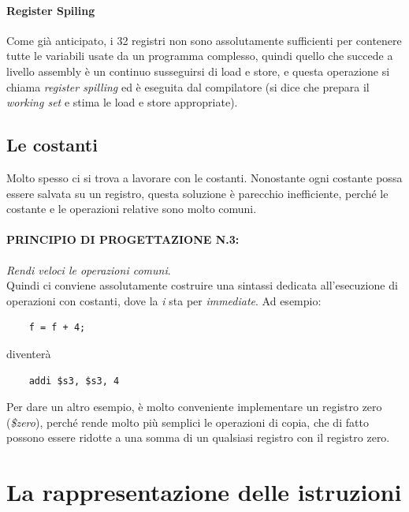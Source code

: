 \documentclass[class=book, crop=false]{standalone}
\begin{document}
\paragraph{Register Spiling}
Come già anticipato, i 32 registri non sono assolutamente sufficienti per contenere tutte le variabili usate da un programma complesso, quindi quello che succede a livello assembly è un continuo susseguirsi di load e store, e questa operazione si chiama \emph{register spilling} ed è eseguita dal compilatore (si dice che  prepara il \emph{working set} e stima le load e store appropriate).

\subsection{Le costanti}
Molto spesso ci si trova a lavorare con le costanti. Nonostante ogni costante possa essere salvata su un registro, questa soluzione è parecchio inefficiente, perché le costante e le operazioni relative sono molto comuni.

\paragraph{PRINCIPIO DI PROGETTAZIONE N.3:}
\emph{Rendi veloci le operazioni comuni}.\\

Quindi ci conviene assolutamente costruire una sintassi dedicata all'esecuzione di operazioni con costanti, dove la \emph{i} sta per \emph{immediate}. Ad esempio:
\begin{verbatim}
	f = f + 4;
\end{verbatim}
diventerà
\begin{verbatim}
	addi $s3, $s3, 4
\end{verbatim}

Per dare un altro esempio, è molto conveniente implementare un registro zero (\emph{\$zero}), perché rende molto più semplici le operazioni di copia, che di fatto possono essere ridotte a una somma di un qualsiasi registro con il registro zero.

\section{La rappresentazione delle istruzioni}
\end{document}
